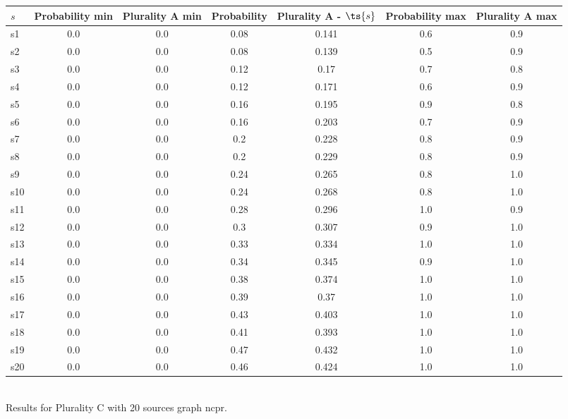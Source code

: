 \documentclass{article}
\begin{document}
\noindent\begin{tabular}{|l|c|c|c|c|c|c|}
\hline
$s$& Probability min & Plurality A min & Probability & Plurality A - $\ts{s}$ & Probability max & Plurality A max\\
\hline
s1 &0.0 & 0.0 & 0.08 & 0.141 & 0.6 & 0.9\\
\hline
s2 &0.0 & 0.0 & 0.08 & 0.139 & 0.5 & 0.9\\
\hline
s3 &0.0 & 0.0 & 0.12 & 0.17 & 0.7 & 0.8\\
\hline
s4 &0.0 & 0.0 & 0.12 & 0.171 & 0.6 & 0.9\\
\hline
s5 &0.0 & 0.0 & 0.16 & 0.195 & 0.9 & 0.8\\
\hline
s6 &0.0 & 0.0 & 0.16 & 0.203 & 0.7 & 0.9\\
\hline
s7 &0.0 & 0.0 & 0.2 & 0.228 & 0.8 & 0.9\\
\hline
s8 &0.0 & 0.0 & 0.2 & 0.229 & 0.8 & 0.9\\
\hline
s9 &0.0 & 0.0 & 0.24 & 0.265 & 0.8 & 1.0\\
\hline
s10 &0.0 & 0.0 & 0.24 & 0.268 & 0.8 & 1.0\\
\hline
s11 &0.0 & 0.0 & 0.28 & 0.296 & 1.0 & 0.9\\
\hline
s12 &0.0 & 0.0 & 0.3 & 0.307 & 0.9 & 1.0\\
\hline
s13 &0.0 & 0.0 & 0.33 & 0.334 & 1.0 & 1.0\\
\hline
s14 &0.0 & 0.0 & 0.34 & 0.345 & 0.9 & 1.0\\
\hline
s15 &0.0 & 0.0 & 0.38 & 0.374 & 1.0 & 1.0\\
\hline
s16 &0.0 & 0.0 & 0.39 & 0.37 & 1.0 & 1.0\\
\hline
s17 &0.0 & 0.0 & 0.43 & 0.403 & 1.0 & 1.0\\
\hline
s18 &0.0 & 0.0 & 0.41 & 0.393 & 1.0 & 1.0\\
\hline
s19 &0.0 & 0.0 & 0.47 & 0.432 & 1.0 & 1.0\\
\hline
s20 &0.0 & 0.0 & 0.46 & 0.424 & 1.0 & 1.0\\
\hline
\end{tabular}\\

\noindent Results for Plurality C with 20 sources graph ncpr.
\end{document}

